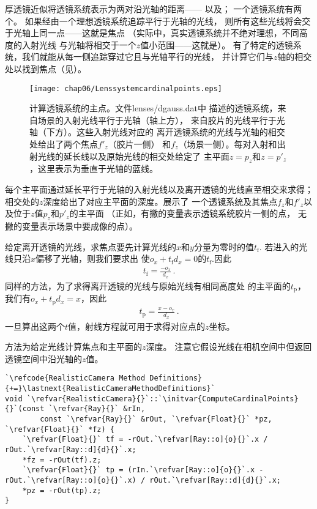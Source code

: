 厚透镜近似将透镜系统表示为两对沿光轴的距离——
以及；
一个透镜系统有两个。
如果经由一个理想透镜系统追踪平行于光轴的光线，
则所有这些光线将会交于光轴上同一点——这就是焦点
（实际中，真实透镜系统并不绝对理想，不同高度的入射光线
与光轴将相交于一个$z$值小范围——这就是）。
有了特定的透镜系统，我们就能从每一侧追踪穿过它且与光轴平行的光线，
并计算它们与$z$轴的相交处以找到焦点（见）。
\begin{figure}[htbp]
    \centering\texttt{[image: chap06/Lenssystemcardinalpoints.eps]}
    \caption{计算透镜系统的主点。文件{\ttfamily lenses/dgauss.dat}中
    描述的透镜系统，来自场景的入射光线平行于光轴（轴上方），
    来自胶片的光线平行于光轴（下方）。这些入射光线对应的
    离开透镜系统的光线与光轴的相交处给出了两个焦点$f'_z$（胶片一侧）
    和$f_z$（场景一侧）。每对入射和出射光线的延长线以及原始光线的相交处给定了
    主平面$z=p_z$和$z=p'_z$，这里表示为垂直于光轴的蓝线。}
    \label{fig:6.20}
\end{figure}

每个主平面通过延长平行于光轴的入射光线以及离开透镜的光线直至相交来求得；
相交处的$z$深度给出了对应主平面的深度。展示了
一个透镜系统及其焦点$f_z$和$f'_z$以及位于$z$值$p_z$和$p'_z$的主平面
（正如，有撇的变量表示透镜系统胶片一侧的点，
无撇的变量表示场景中要成像的点）。

给定离开透镜的光线，求焦点要先计算光线的$x$和$y$分量为零时的值$t_{\mathrm{f}}$.
若进入的光线只沿$x$偏移了光轴，则我们要求出
使$o_x+t_{\mathrm{f}}d_x=0$的$t_{\mathrm{f}}$.因此
\begin{align*}
    t_{\mathrm{f}}=\frac{-o_x}{d_x}\, .
\end{align*}
同样的方法，为了求得离开透镜的光线与原始光线有相同高度处
的主平面的$t_{\mathrm{p}}$，我们有$o_x+t_{\mathrm{p}}d_x=x$，因此
\begin{align*}
    t_{\mathrm{p}}=\frac{x-o_x}{d_x}\, .
\end{align*}
一旦算出这两个$t$值，射线方程就可用于求得对应点的$z$坐标。

方法为给定光线计算焦点和主平面的$z$深度。
注意它假设光线在相机空间中但返回透镜空间中沿光轴的$z$值。
\begin{lstlisting}
`\refcode{RealisticCamera Method Definitions}{+=}\lastnext{RealisticCameraMethodDefinitions}`
void `\refvar{RealisticCamera}{}`::`\initvar{ComputeCardinalPoints}{}`(const `\refvar{Ray}{}` &rIn,
        const `\refvar{Ray}{}` &rOut, `\refvar{Float}{}` *pz, `\refvar{Float}{}` *fz) {
    `\refvar{Float}{}` tf = -rOut.`\refvar[Ray::o]{o}{}`.x / rOut.`\refvar[Ray::d]{d}{}`.x;
    *fz = -rOut(tf).z;
    `\refvar{Float}{}` tp = (rIn.`\refvar[Ray::o]{o}{}`.x - rOut.`\refvar[Ray::o]{o}{}`.x) / rOut.`\refvar[Ray::d]{d}{}`.x;
    *pz = -rOut(tp).z;
}
\end{lstlisting}


